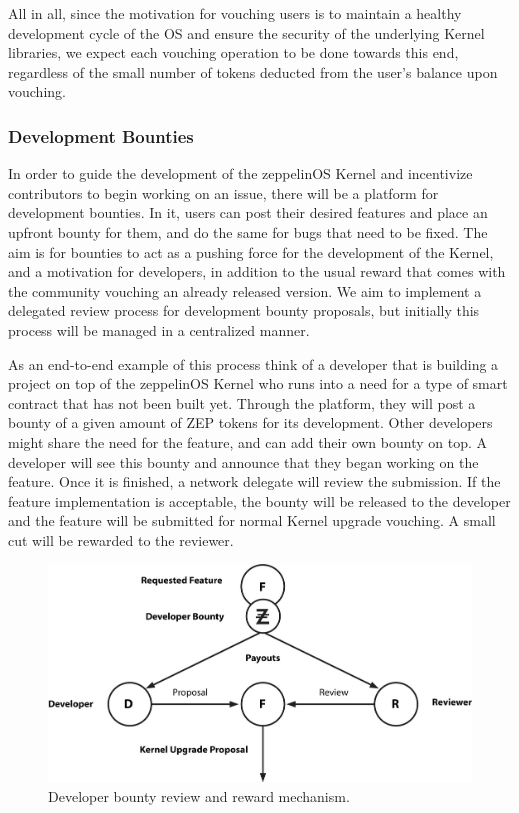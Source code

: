 \documentclass[]{article}
\makeatletter
\DeclareRobustCommand{\_}{%
  \leavevmode\vbox{%
    \hrule\@width.5em
          \@height-.26ex
          \@depth\dimexpr.26ex+.28pt\relax}}
\makeatother
\begin{document}
All in all, since the motivation for vouching users is to maintain a
healthy development cycle of the OS and ensure the security of the
underlying Kernel libraries, we expect each vouching operation to be
done towards this end, regardless of the small number of tokens deducted
from the user's balance upon vouching.

\subsubsection{Development Bounties}

In order to guide the development of the zeppelinOS Kernel and
incentivize contributors to begin working on an issue, there will be a
platform for development bounties. In it, users can post their desired
features and place an upfront bounty for them, and do the same for bugs
that need to be fixed. The aim is for bounties to act as a pushing force
for the development of the Kernel, and a motivation for developers, in
addition to the usual reward that comes with the community vouching an
already released version. We aim to implement a delegated review process
for development bounty proposals, but initially this process will be
managed in a centralized manner.

As an end-to-end example of this process think of a developer that is
building a project on top of the zeppelinOS Kernel who runs into a need
for a type of smart contract that has not been built yet. Through the
platform, they will post a bounty of a given amount of ZEP tokens for
its development. Other developers might share the need for the feature,
and can add their own bounty on top. A developer will see this bounty
and announce that they began working on the feature. Once it is
finished, a network delegate will review the
submission. If
the feature implementation is acceptable, the bounty will be released to
the developer and the feature will be submitted for normal Kernel
upgrade vouching. A small cut will be rewarded to the reviewer.

\begin{figure}
  \centering
  \includegraphics[width=0.75\linewidth]{images/image4.jpg}
  \caption{Developer bounty review and reward mechanism.}
\end{figure}
\end{document}

